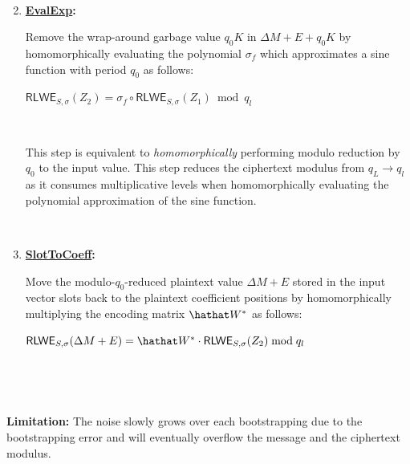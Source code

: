 \begin{tcolorbox}[title={\textbf{\tboxlabel{\ref*{subsubsec:ckks-bootstrapping-summary}} CKKS Bootstrapping}}]
\begin{enumerate}
$ $

\item \textsf{\textbf{\underline{EvalExp}:}} 

Remove the wrap-around garbage value $q_0K$ in $\Delta M + E + q_0K$ by homomorphically evaluating the polynomial $\sigma_f$ which approximates a sine function with period $q_0$ as follows: 

$\textsf{RLWE}_{S, \sigma}(Z_2) = \sigma_f \circ \textsf{RLWE}_{S, \sigma}(Z_1)  \bmod q_l$

$ $

This step is equivalent to \textit{homomorphically} performing modulo reduction by $q_0$ to the input value. This step reduces the ciphertext modulus from $q_L \rightarrow q_l$ as it consumes multiplicative levels when homomorphically evaluating the polynomial approximation of the sine function.

$ $

\item \textsf{\textbf{\underline{SlotToCoeff}:}} 

Move the modulo-$q_0$-reduced plaintext value $\Delta M + E$ stored in the input vector slots back to the plaintext coefficient positions by homomorphically multiplying the encoding matrix $\hathat W^*$ as follows:

$\textsf{RLWE}_{S, \sigma}(\Delta M + E) = \hathat W^* \cdot \textsf{RLWE}_{S, \sigma}(Z_2)  \bmod q_l$

$ $

\end{enumerate}

$ $

\textbf{Limitation:} The noise slowly grows over each bootstrapping due to the bootstrapping error and will eventually overflow the message and the ciphertext modulus. 

\end{tcolorbox}


